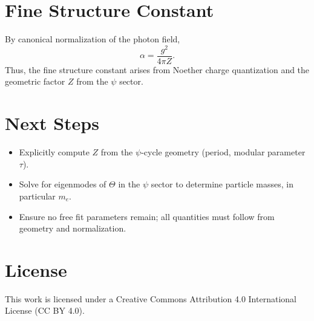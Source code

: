 \documentclass[12pt]{article}
\begin{document}
\section{Fine Structure Constant}
By canonical normalization of the photon field,
\begin{equation}
\alpha = \frac{g^2}{4\pi Z}.
\end{equation}
Thus, the fine structure constant arises from Noether charge quantization and the geometric factor $Z$ from the $\psi$ sector.

\section{Next Steps}
\begin{itemize}
\item Explicitly compute $Z$ from the $\psi$-cycle geometry (period, modular parameter $\tau$).
\item Solve for eigenmodes of $\Theta$ in the $\psi$ sector to determine particle masses, in particular $m_e$.
\item Ensure no free fit parameters remain; all quantities must follow from geometry and normalization.
\end{itemize}


\section*{License}
This work is licensed under a Creative Commons Attribution 4.0 International License (CC BY 4.0).
\end{document}
